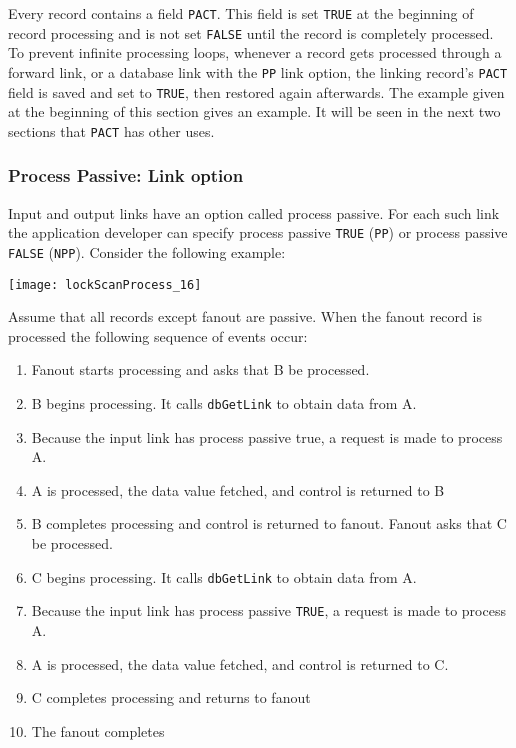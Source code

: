 Every record contains a field \verb|PACT|.
This field is set \verb|TRUE| at the beginning of record processing and is not set \verb|FALSE| until the record is completely processed.
To prevent infinite processing loops, whenever a record gets processed through a forward link, or a database link with the \verb|PP| link option, the linking record's \verb|PACT| field is saved and set to \verb|TRUE|, then restored again afterwards.
The example given at the beginning of this section gives an example.
It will be seen in the next two sections that \verb|PACT| has other uses.

\subsubsection{Process Passive: Link option}

Input and output links have an option called process passive.
For each such link the application developer can specify process passive \verb|TRUE| (\verb|PP|) or process passive \verb|FALSE| (\verb|NPP|).
Consider the following example:

\begin{center}
\texttt{[image: lockScanProcess\_16]}
\end{center}

Assume that all records except fanout are passive.
When the fanout record is processed the following sequence of events occur:

\begin{enumerate}
\item Fanout starts processing and asks that B be processed.

\item B begins processing.
It calls \verb|dbGetLink| to obtain data from A.

\item Because the input link has process passive true, a request is made to process A.

\item A is processed, the data value fetched, and control is returned to B

\item B completes processing and control is returned to fanout.
Fanout asks that C be processed.

\item C begins processing.
It calls \verb|dbGetLink| to obtain data from A.

\item Because the input link has process passive \verb|TRUE|, a request is made to process A.

\item A is processed, the data value fetched, and control is returned to C.

\item C completes processing and returns to fanout

\item The fanout completes

\end{enumerate}

